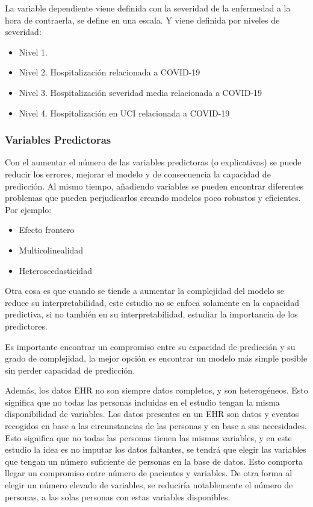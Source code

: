 \documentclass[
]{article}
\begin{document}
La variable dependiente viene definida con la severidad de la enfermedad
a la hora de contraerla, se define en una escala. Y viene definida por
niveles de severidad:

\begin{itemize}
\item
  Nivel 1.
\item
  Nivel 2. Hospitalización relacionada a COVID-19
\item
  Nivel 3. Hospitalización severidad media relacionada a COVID-19
\item
  Nivel 4. Hospitalización en UCI relacionada a COVID-19
\end{itemize}

\hypertarget{variables-predictoras}{%
\subsubsection{Variables Predictoras}\label{variables-predictoras}}

Con el aumentar el número de las variables predictoras (o explicativas)
se puede reducir los errores, mejorar el modelo y de consecuencia la
capacidad de predicción. Al mismo tiempo, añadiendo variables se pueden
encontrar diferentes problemas que pueden perjudicarlos creando modelos
poco robustos y eficientes. Por ejemplo:

\begin{itemize}
\item
  Efecto frontero
\item
  Multicolinealidad
\item
  Heteroscedasticidad
\end{itemize}

Otra cosa es que cuando se tiende a aumentar la complejidad del modelo
se reduce su interpretabilidad, este estudio no se enfoca solamente en
la capacidad predictiva, si no también en su interpretabilidad, estudiar
la importancia de los predictores.

Es importante encontrar un compromiso entre su capacidad de predicción y
su grado de complejidad, la mejor opción es encontrar un modelo más
simple posible sin perder capacidad de predicción.

Además, los datos EHR no son siempre datos completos, y son
heterogéneos. Esto significa que no todas las personas incluidas en el
estudio tengan la misma disponibilidad de variables. Los datos presentes
en un EHR son datos y eventos recogidos en base a las circunstancias de
las personas y en base a sus necesidades. Esto significa que no todas
las personas tienen las mismas variables, y en este estudio la idea es
no imputar los datos faltantes, se tendrá que elegir las variables que
tengan un número suficiente de personas en la base de datos. Esto
comporta llegar un compromiso entre número de pacientes y variables. De
otra forma al elegir un número elevado de variables, se reduciría
notablemente el número de personas, a las solas personas con estas
variables disponibles.
\end{document}
